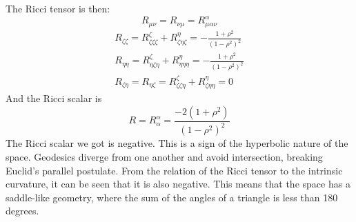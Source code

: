 \documentclass{article}
\begin{document}
The Ricci tensor is then:
\begin{equation}
    R_{\mu\nu} = R_{\nu\mu} = R^\alpha_{\mu\alpha\nu}
\end{equation}
\begin{equation}
\begin{gathered}
    R_{\zeta\zeta} = R^\zeta_{\zeta\zeta\zeta} + R^\eta_{\zeta\eta\zeta} = -\frac{1 + \rho^2}{(1-\rho^2)^2} \\
    R_{\eta\eta} = R^\zeta_{\eta\zeta\eta} + R^\eta_{\eta\eta\eta} = -\frac{1 + \rho^2}{(1-\rho^2)^2} \\
    R_{\zeta\eta} = R_{\eta\zeta} = R^\zeta_{\zeta\zeta\eta} + R^\eta_{\zeta\eta\eta} = 0
\end{gathered}
\end{equation}
And the Ricci scalar is
\begin{equation}
    R = R^\alpha_\alpha = \frac{-2(1+\rho^2)}{(1-\rho^2)^2}
\end{equation}
The Ricci scalar we got is negative. This is a sign of the hyperbolic nature of the space. Geodesics diverge from one another and avoid intersection, breaking Euclid's parallel postulate.
\newline
From the relation of the Ricci tensor to the intrinsic curvature, it can be seen that it is also negative. This means that the space has a saddle-like geometry, where the sum of the angles of a triangle is less than 180 degrees.
\end{document}
